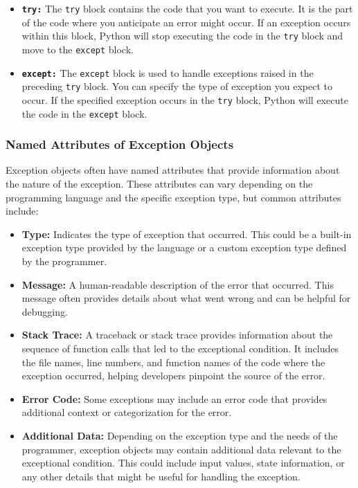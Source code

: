 \begin{itemize}
    \item \textbf{\texttt{try:}} The \texttt{try} block contains the code that you want to execute. It is the part of the code where you anticipate an error might occur. If an exception occurs within this block, Python will stop executing the code in the \texttt{try} block and move to the \texttt{except} block.
    \item \textbf{\texttt{except:}} The \texttt{except} block is used to handle exceptions raised in the preceding \texttt{try} block. You can specify the type of exception you expect to occur. If the specified exception occurs in the \texttt{try} block, Python will execute the code in the \texttt{except} block.
\end{itemize}

\subsubsection{Named Attributes of Exception Objects}
Exception objects often have named attributes that provide information about the nature of the exception. These attributes can vary depending on the programming language and the specific exception type, but common attributes include:
\begin{itemize}
    \item \textbf{Type:} Indicates the type of exception that occurred. This could be a built-in exception type provided by the language or a custom exception type defined by the programmer.
    \item \textbf{Message:} A human-readable description of the error that occurred. This message often provides details about what went wrong and can be helpful for debugging.
    \item \textbf{Stack Trace:} A traceback or stack trace provides information about the sequence of function calls that led to the exceptional condition. It includes the file names, line numbers, and function names of the code where the exception occurred, helping developers pinpoint the source of the error.
    \item \textbf{Error Code:} Some exceptions may include an error code that provides additional context or categorization for the error.
    \item \textbf{Additional Data:} Depending on the exception type and the needs of the programmer, exception objects may contain additional data relevant to the exceptional condition. This could include input values, state information, or any other details that might be useful for handling the exception.
\end{itemize}

